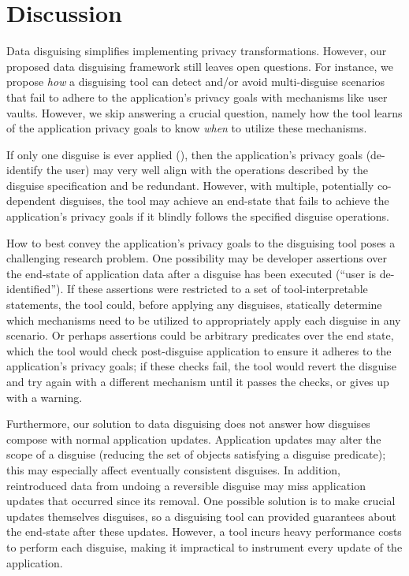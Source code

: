 \section{Discussion}
\label{s:disc}
%
Data disguising simplifies implementing privacy transformations.
%
However, our proposed data disguising framework still leaves open questions.
%
For instance, we propose \emph{how} a disguising tool can detect and/or avoid multi-disguise
scenarios that fail to adhere to the application's privacy goals with mechanisms like user vaults.
However, we skip answering a crucial question, namely how the tool learns of the application
privacy goals to know \emph{when} to utilize these mechanisms.

If only one disguise is ever applied (\eg \gdpr), then the application's
privacy goals (\eg de-identify the user) may very well align with the operations described by the
disguise specification and be redundant.  However, with multiple, potentially co-dependent disguises,
the tool may achieve an end-state that fails to achieve the application's privacy goals if it
blindly follows the specified disguise operations.

How to best convey the application's privacy goals to the disguising tool poses a challenging
research problem. One possibility may be developer assertions over the end-state of application data
after a disguise has been executed (\eg ``user is de-identified''). If these assertions were
restricted to a set of tool-interpretable statements, the tool could, before applying any disguises,
statically determine which mechanisms need to be utilized to appropriately apply each disguise in
any scenario.  Or perhaps assertions could be arbitrary predicates over the end state, which the
tool would check post-disguise application to ensure it adheres to the application's privacy goals;
if these checks fail, the tool would revert the disguise and try again with a different mechanism
until it passes the checks, or gives up with a warning.

%
Furthermore, our solution to data disguising does not answer how disguises compose with normal
application updates.
%
Application updates may alter the scope of a disguise (\ie reducing the set of
objects satisfying a disguise predicate); this may especially affect eventually
consistent disguises.
%
In addition, reintroduced data from undoing a reversible disguise may miss application updates that
occurred since its removal. One possible solution is to make crucial updates themselves disguises,
so a disguising tool can provided guarantees about the end-state after these updates.
However, a tool incurs heavy performance costs to perform each disguise, making it
impractical to instrument every update of the application.

